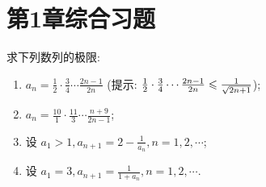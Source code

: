 \section*{第1章综合习题}

\begin{exercise}[1.C.1]
    求下列数列的极限:
    \begin{enumerate}[(1)]
        \item $a_n = \frac{1}{2} \cdot \frac{3}{4} \cdots \frac{2n-1}{2n}$ (提示: $\frac{1}{2} \cdot \frac{3}{4} \cdots \frac{2n-1}{2n} \leqslant \frac{1}{\sqrt{2n+1}}$);
        \item $a_n = \frac{10}{1} \cdot \frac{11}{3} \cdots \frac{n+9}{2n-1}$;
        \item 设 $a_1 > 1,  a_{n+1} = 2 - \frac{1}{a_n},  n=1, 2, \cdots$;
        \item 设 $a_1 = 3,  a_{n+1} = \frac{1}{1+a_n},  n=1, 2, \cdots$.
    \end{enumerate}
\end{exercise}

